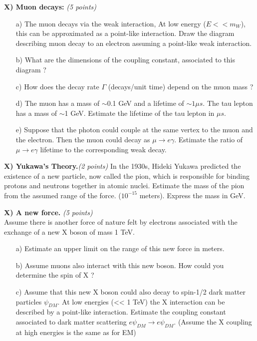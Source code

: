 {\textbf{X) Muon decays: } \hfill \textit{(5 points)}\\
\begin{itemize}
  \item[a)]{ The muon decays via the weak interaction,  At low energy ($E << m_W$), this can be approximated as a point-like interaction. 
  Draw the diagram describing muon decay to an electron assuming a point-like weak interaction.}
  \item[b)]{ What are the dimensions of the coupling constant, associated to this diagram  ?
  }
  \item[c)] How does the decay rate $\Gamma$ (decays/unit time)  depend on the muon mass ?
  \item[d)] The muon has a mass of $\sim$0.1 GeV and a lifetime of $\sim 1 \mu s$. The tau lepton has a mass of {$\sim$1 GeV}. Estimate the lifetime of the tau lepton in $\mu s$.
  \item[e)] {Suppose that the photon could couple at the same vertex to the muon and the electron. Then the muon could decay as $\mu\rightarrow e \gamma$. 
  Estimate the ratio of $\mu\rightarrow e \gamma$ lifetime to the corresponding weak decay.}
\end{itemize}


\textbf{X) Yukawa’s Theory.}\hfill \textit{(2 points)}
In the 1930s, Hideki Yukawa predicted the existence of a new particle, now called the pion, which is responsible for binding protons and neutrons together in atomic nuclei. 
Estimate the mass of the pion from the assumed range of the force. ($10^{-15}$ meters). 
Express the mass in GeV.


\textbf{X) A new force. } \hfill \textit{(5 points)}\\
Assume there is another force of nature felt by electrons associated with the exchange of a new X boson of mass 1 TeV.
\begin{itemize}
\item[a)]{ Estimate an upper limit on the range of this new force in meters.}
\item[b)]{ Assume muons also interact with this new boson. How could you determine the spin of X ?}
\item[c)]{ Assume that this new X boson could also decay to spin-1/2 dark matter particles $\psi_{DM}$. At low energies (<< 1 TeV) the X interaction can be described by a point-like interaction. Estimate the coupling constant associated to dark matter scattering $e \psi_{DM} \rightarrow e \psi_{DM}$.   (Assume the X coupling at high energies is the same as for EM)  }
\end{itemize}

}
